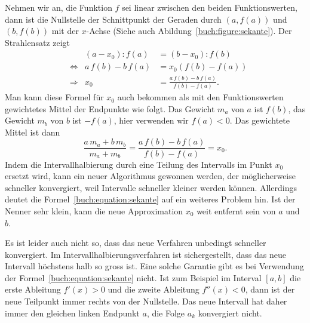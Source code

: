 Nehmen wir an, die Funktion $f$ sei linear zwischen den beiden
Funktionswerten, dann ist die Nullstelle der Schnittpunkt
der Geraden durch $(a,f(a))$ und $(b,f(b))$ mit der $x$-Achse
(Siehe auch Abildung~\ref{buch:figure:sekante}).
Der Strahlensatz zeigt
\[
\begin{aligned}
&&
(a-x_0) : f(a)
&=
(b - x_0) : f(b)
\\
&\Leftrightarrow&
a\,f(b) - b\,f(a)
&=
x_0(f(b)-f(a))
\\
&\Rightarrow&
x_0
&=
\frac{a\,f(b)-b\,f(a)}{f(b)-f(a)}.
\end{aligned}
\]
Man kann diese Formel für $x_0$ auch bekommen als mit den
Funktionswerten gewichtetes Mittel der Endpunkte wie folgt.
Das Gewicht $m_a$ von $a$ ist $f(b)$, das Gewicht $m_b$ von
$b$ ist $-f(a)$, hier verwenden wir $f(a)<0$.
Das gewichtete Mittel ist dann
\begin{equation}
\frac{a\,m_a+b\,m_b}{m_a+m_b}
=
\frac{a\,f(b)-b\,f(a)}{f(b)-f(a)}=x_0.
\label{buch:equation:sekante}
\end{equation}
Indem die Intervallhalbierung durch eine Teilung des
Intervalls im Punkt $x_0$ ersetzt wird, kann ein neuer Algorithmus
gewonnen werden, der möglicherweise schneller konvergiert, weil
Intervalle schneller kleiner werden können.
Allerdings deutet die Formel~\eqref{buch:equation:sekante} auf
ein weiteres Problem hin.
Ist der Nenner sehr klein, kann die neue Approximation $x_0$ weit
entfernt sein von $a$ und $b$.

Es ist leider auch nicht so, dass das neue Verfahren unbedingt schneller 
konvergiert.
Im Intervallhalbierungsverfahren ist sichergestellt, dass das neue
Intervall höchstens halb so gross ist.
Eine solche Garantie gibt es bei Verwendung der
Formel~\eqref{buch:equation:sekante} nicht.
Ist zum Beispiel im Interval $[a,b]$ die erste Ableitung $f'(x)>0$ und
die zweite Ableitung $f''(x)<0$,
dann ist der neue Teilpunkt immer rechts von der Nullstelle.
Das neue Intervall hat daher immer den gleichen linken Endpunkt $a$,
die Folge $a_k$ konvergiert nicht.

